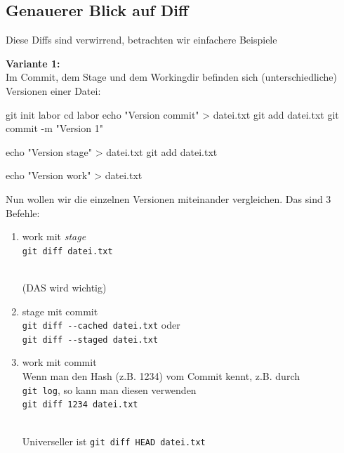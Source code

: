 \documentclass[
  letterpaper,
  DIV=11]{scrreprt}
\newenvironment{Shaded}{\begin{snugshade}}{\end{snugshade}}
\newcommand{\AttributeTok}[1]{\textcolor[rgb]{0.40,0.45,0.13}{#1}}
\newcommand{\BuiltInTok}[1]{\textcolor[rgb]{0.00,0.23,0.31}{#1}}
\newcommand{\FunctionTok}[1]{\textcolor[rgb]{0.28,0.35,0.67}{#1}}
\newcommand{\NormalTok}[1]{\textcolor[rgb]{0.00,0.23,0.31}{#1}}
\newcommand{\OperatorTok}[1]{\textcolor[rgb]{0.37,0.37,0.37}{#1}}
\newcommand{\StringTok}[1]{\textcolor[rgb]{0.13,0.47,0.30}{#1}}
\providecommand{\tightlist}{%
  \setlength{\itemsep}{0pt}\setlength{\parskip}{0pt}}\usepackage{longtable,booktabs,array}
\begin{document}
\subsection{Genauerer Blick auf Diff}\label{genauerer-blick-auf-diff}

Diese Diffs sind verwirrend, betrachten wir einfachere Beispiele

\textbf{Variante 1:}\\
Im Commit, dem Stage und dem Workingdir befinden sich (unterschiedliche)
Versionen einer Datei:

\begin{Shaded}
\begin{Highlighting}[]
\FunctionTok{git}\NormalTok{ init labor}
\BuiltInTok{cd}\NormalTok{ labor }
\BuiltInTok{echo} \StringTok{"Version commit"} \OperatorTok{\textgreater{}}\NormalTok{ datei.txt }
\FunctionTok{git}\NormalTok{ add datei.txt }
\FunctionTok{git}\NormalTok{ commit }\AttributeTok{{-}m} \StringTok{"Version 1"}

\BuiltInTok{echo} \StringTok{"Version stage"} \OperatorTok{\textgreater{}}\NormalTok{ datei.txt }
\FunctionTok{git}\NormalTok{ add datei.txt }

\BuiltInTok{echo} \StringTok{"Version work"} \OperatorTok{\textgreater{}}\NormalTok{ datei.txt }
\end{Highlighting}
\end{Shaded}

Nun wollen wir die einzelnen Versionen miteinander vergleichen. Das sind
3 Befehle:

\begin{enumerate}
\def\labelenumi{\arabic{enumi}.}
\tightlist
\item
  work mit \emph{stage}\\
  \texttt{git\ diff\ datei.txt}\strut \\
  (DAS wird wichtig)
\item
  stage mit commit\\
  \texttt{git\ diff\ -\/-cached\ datei.txt} oder\\
  \texttt{git\ diff\ -\/-staged\ datei.txt}
\item
  work mit commit\\
  Wenn man den Hash (z.B. 1234) vom Commit kennt, z.B. durch\\
  \texttt{git\ log}, so kann man diesen verwenden\\
  \texttt{git\ diff\ 1234\ datei.txt}\strut \\
  Universeller ist \texttt{git\ diff\ HEAD\ datei.txt}
\end{enumerate}
\end{document}
